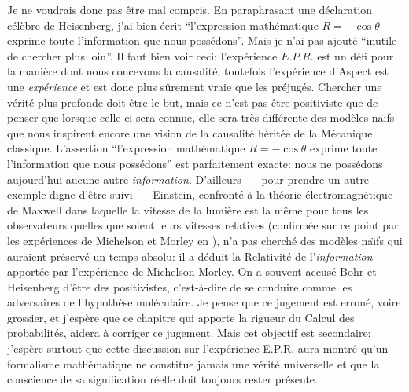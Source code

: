 \medskip 
Je ne voudrais donc pas \^etre mal compris. En paraphrasant une  
d\'ecla\-ra\-tion c\'el\`ebre de Heisenberg,  j'ai bien \'ecrit ``l'expression  
math\'e\-ma\-ti\-que $R = -\cos\theta$ exprime toute l'information que
nous poss\'edons''.  Mais je n'ai pas ajout\'e ``inutile de chercher plus 
loin''. Il faut bien voir ceci:  l'exp\'erience $E.P.R.$ est un d\'efi pour
la mani\`ere  dont nous concevons la causalit\'e; toutefois l'exp\'erience 
d'Aspect est une {\it exp\'erience} et est donc plus s\^urement vraie que  
les pr\'ejug\'es.  Chercher une v\'erit\'e plus profonde doit \^etre le but, 
mais ce n'est pas \^etre positiviste que de penser que lorsque celle-ci 
sera connue,  elle sera tr\`es diff\'erente des mod\`eles na\"\i fs que  
nous inspirent encore une vision de la causalit\'e h\'erit\'ee de la 
M\'ecanique classique.  L'assertion ``l'expression math\'ematique $R = 
-\cos\theta$ exprime toute l'information que nous poss\'edons'' est 
parfaitement exacte:  nous ne poss\'edons aujourd'hui aucune autre
{\it  information}.  D'ailleurs ---~pour prendre un autre exemple
digne d'\^etre suivi~--- Einstein,  confront\'e \`a la th\'eorie
\'electromagn\'etique de Maxwell dans laquelle la vitesse de la lumi\`ere
est la m\^eme pour tous les observateurs quelles que soient leurs
vitesses relatives (confirm\'ee sur ce point par les exp\'eriences
de Michelson et Morley en {}),  n'a pas cherch\'e des
mod\`eles na\"\i fs qui auraient pr\'eserv\'e un temps absolu:  il a
d\'eduit la Relativit\'e de l'{\it information} apport\'ee par
l'exp\'erience de Michelson-Morley.  On a souvent accus\'e Bohr et
Heisenberg d'\^etre des positivistes,  c'est-\`a-dire de se conduire
comme les adversaires de l'hypoth\`ese mol\'eculaire.  Je pense que ce 
jugement est erron\'e,  voire grossier,  et j'esp\`ere que ce chapitre 
qui apporte la rigueur du Calcul des probabilit\'es,  aidera \`a 
corriger ce jugement.  
\medskip 
Mais cet objectif est secondaire:  j'esp\`ere surtout que cette discussion 
sur l'exp\'erience E.P.R. aura montr\'e qu'un formalisme math\'ematique  
ne constitue jamais une v\'erit\'e universelle et que la conscience de sa 
signification r\'eelle doit toujours rester pr\'esente.  


\bye 



